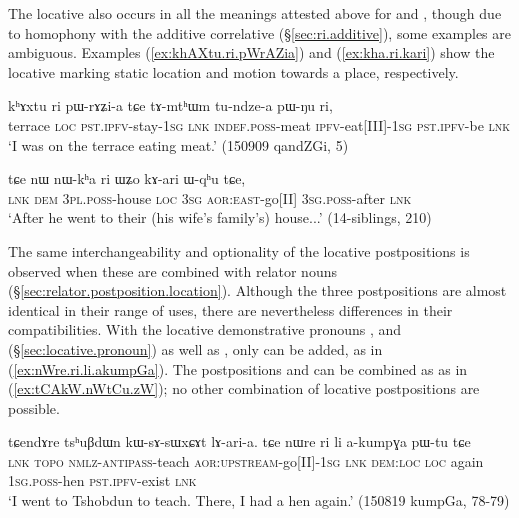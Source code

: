  The locative  also occurs in all the meanings attested above for  and , though due to homophony with the additive correlative  (§\ref{sec:ri.additive}), some examples are ambiguous. Examples (\ref{ex:khAXtu.ri.pWrAZia}) and (\ref{ex:kha.ri.kari}) show the locative  marking static location and motion towards a place, respectively.

\begin{exe}
\ex \label{ex:khAXtu.ri.pWrAZia}
\gll   kʰɤxtu ri pɯ-rɤʑi-a tɕe tɤ-mtʰɯm tu-ndze-a pɯ-ŋu ri, \\
terrace \textsc{loc} \textsc{pst}.\textsc{ipfv}-stay-\textsc{1sg} \textsc{lnk} \textsc{indef}.\textsc{poss}-meat \textsc{ipfv}-eat[III]-\textsc{1sg} \textsc{pst}.\textsc{ipfv}-be \textsc{lnk} \\
\glt `I was on the terrace eating meat.' (150909 qandZGi, 5)
 \end{exe}
 
 \begin{exe}
\ex \label{ex:kha.ri.kari}
\gll   tɕe nɯ nɯ-kʰa ri ɯʑo kɤ-ari ɯ-qʰu tɕe, \\
\textsc{lnk} \textsc{dem} \textsc{3pl}.\textsc{poss}-house \textsc{loc} \textsc{3sg} \textsc{aor}:\textsc{east}-go[II] \textsc{3sg}.\textsc{poss}-after \textsc{lnk} \\
\glt `After he went to their (his wife's family's) house...' (14-siblings, 210)
  \end{exe}
  
The same interchangeability and optionality of the locative postpositions is observed when these are combined with relator nouns (§\ref{sec:relator.postposition.location}). Although the three postpositions are almost identical in their range of uses, there are nevertheless differences in their compatibilities.  With the locative demonstrative pronouns , and   (§\ref{sec:locative.pronoun}) as well as , only  can be added, as in (\ref{ex:nWre.ri.li.akumpGa}). The postpositions  and  can be combined as  as in (\ref{ex:tCAkW.nWtCu.zW}); no other combination of locative postpositions are possible.

 \begin{exe}
\ex \label{ex:nWre.ri.li.akumpGa}
\gll tɕendɤre tsʰuβdɯn kɯ-sɤ-sɯxɕɤt lɤ-ari-a. tɕe nɯre ri li a-kumpɣa pɯ-tu tɕe \\
\textsc{lnk}  \textsc{topo} \textsc{nmlz}-\textsc{antipass}-teach \textsc{aor}:\textsc{upstream}-go[II]-\textsc{1sg} \textsc{lnk} \textsc{dem}:\textsc{loc} \textsc{loc} again \textsc{1sg}.\textsc{poss}-hen \textsc{pst}.\textsc{ipfv}-exist \textsc{lnk} \\
\glt `I went to Tshobdun to teach. There, I had a hen again.' (150819 kumpGa, 78-79)
  \end{exe}

